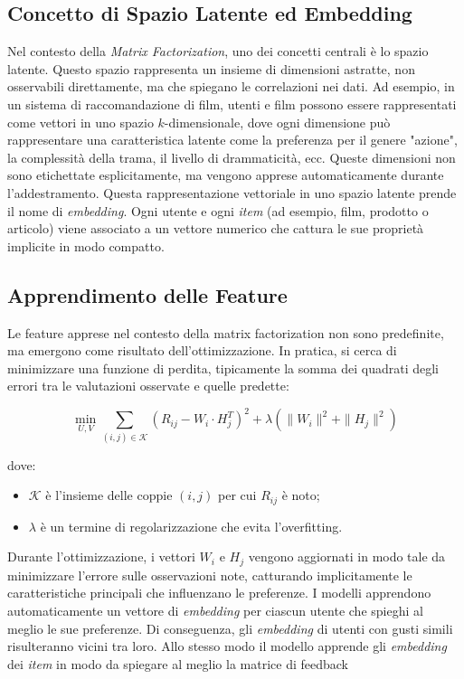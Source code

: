\subsection{Concetto di Spazio Latente ed Embedding}
Nel contesto della \textit{Matrix Factorization}, uno dei concetti centrali è lo spazio latente. Questo spazio rappresenta un insieme di dimensioni astratte, non osservabili direttamente, ma che spiegano le correlazioni nei dati. Ad esempio, in un sistema di raccomandazione di film, utenti e film possono essere rappresentati come vettori in uno spazio $k$-dimensionale, dove ogni dimensione può rappresentare una caratteristica latente come la preferenza per il genere "azione", la complessità della trama, il livello di drammaticità, ecc. Queste dimensioni non sono etichettate esplicitamente, ma vengono apprese automaticamente durante l'addestramento. Questa rappresentazione vettoriale in uno spazio latente prende il nome di \textit{embedding}. Ogni utente e ogni \textit{item} (ad esempio, film, prodotto o articolo) viene associato a un vettore numerico che cattura le sue proprietà implicite in modo compatto.

\subsection{Apprendimento delle Feature}
Le feature apprese nel contesto della matrix factorization non sono predefinite, ma emergono come risultato dell'ottimizzazione. In pratica, si cerca di minimizzare una funzione di perdita, tipicamente la somma dei quadrati degli errori tra le valutazioni osservate e quelle predette:

\[
\min_{U,V} \sum_{(i,j) \in \mathcal{K}} (R_{ij} - W_i \cdot H_j^T)^2 + \lambda ( \|W_i\|^2 + \|H_j\|^2 )
\]

dove:
\begin{itemize}
    \item $\mathcal{K}$ è l'insieme delle coppie $(i,j)$ per cui $R_{ij}$ è noto;
    \item $\lambda$ è un termine di regolarizzazione che evita l'overfitting.
\end{itemize}

Durante l'ottimizzazione, i vettori $W_i$ e $H_j$ vengono aggiornati in modo tale da minimizzare l'errore sulle osservazioni note, catturando implicitamente le caratteristiche principali che influenzano le preferenze. I modelli apprendono automaticamente un vettore di \textit{embedding} per ciascun utente che spieghi al meglio le sue preferenze. Di conseguenza, gli \textit{embedding} di utenti con gusti simili risulteranno vicini tra loro. Allo stesso modo il modello apprende gli \textit{embedding} dei 
\textit{item} in modo da spiegare al meglio la matrice di feedback

